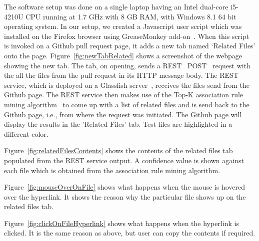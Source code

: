 The software setup was done on a single laptop having an Intel dual-core i5-4210U CPU running at 1.7 GHz with 8 GB RAM, with Windows 8.1 64 bit operating system. In our setup, we created a Javascript user script which was installed on the Firefox browser using GreaseMonkey add-on~\cite{greasemonkey1,greasemonkey2}. When this script is invoked on a Github pull request page, it adds a new tab named `Related Files' onto the page. Figure~\ref{fig:newTabRelated} shows a screenshot of the webpage showing the new tab. The tab, on opening, sends a REST~\cite{rest} POST~\cite{post_http} request with the all the files from the pull request in its HTTP message body. The REST service, which is deployed on a Glassfish server~\cite{glassfish}, receives the files send from the Github page. The REST service then makes use of the Top-K association rule mining algorithm~\cite{fournier2012mining} to come up with a list of related files and is send back to the Github page, i.e., from where the request was initiated. The Github page will display the results in the 'Related Files' tab. Test files are highlighted in a different color. 

Figure~\ref{fig:relatedFilesContents} shows the contents of the related files tab populated from the REST service output. A confidence value is shown against each file which is obtained from the association rule mining algorithm.

Figure~\ref{fig:mouseOverOnFile} shows what happens when the mouse is hovered over the hyperlink. It shows the reason why the particular file shows up on the related files tab.

Figure~\ref{fig:clickOnFileHyperlink} shows what happens when the hyperlink is clicked. It is the same reason as above, but user can copy the contents if required.

